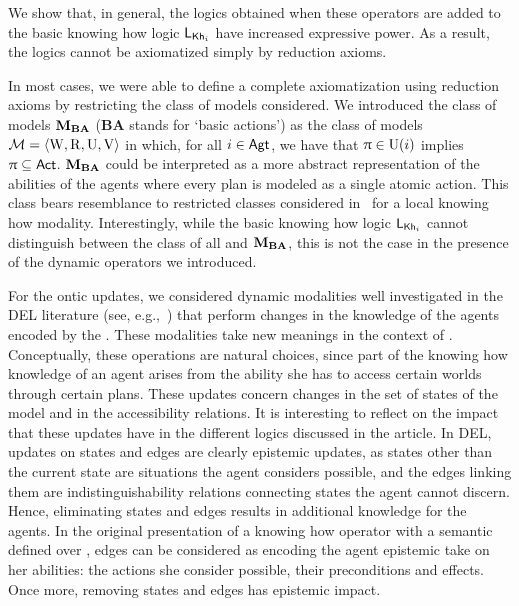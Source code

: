 We show that, in general, the logics obtained when these operators are added to the basic knowing how logic $\mathsf{L}_{{\sf Kh}_i}$ have increased expressive power.  As a result, the logics cannot be axiomatized simply by reduction axioms. 

\begin{mrevised}
In most cases, we were able to define a complete axiomatization using reduction axioms by restricting the class of models considered.  We introduced the class of models $\mathbf{M}_{\mathbf{BA}}$ (\textbf{BA} stands for `basic actions') as the class of models $\mathcal{M} = \langle \operatorname{W}, \operatorname{R}, \operatorname{U}, \operatorname{V} \rangle$ in which, for all $i \in {\rm \sf Agt}$, we have that $\uppi \in \operatorname{U}(i)$ implies $\uppi \subseteq {\rm \sf Act}$.  $\mathbf{M}_{\mathbf{BA}}$ could be interpreted as a more abstract representation of the abilities of the agents where every plan is modeled as a single atomic action.  This class bears resemblance to restricted classes considered in~\cite{Li21} for a local knowing how modality.
Interestingly, while the basic knowing how logic $\mathsf{L}_{{\sf Kh}_i}$ cannot distinguish between the class of all \ults and $\mathbf{M}_{\mathbf{BA}}$, this is not the case in the presence of the dynamic operators we introduced. 

For the ontic updates, we considered dynamic modalities well investigated in the DEL literature (see, e.g.,~\cite{Plaza89:lopc,KooiR11,DELbook}) that perform changes in the knowledge of the agents encoded by the \lts. These modalities take new meanings in the context of .  Conceptually, these operations are natural choices, since part of the knowing how knowledge of an agent arises from the ability she has to access certain worlds through certain plans.  These updates concern changes in the set of states of the model and in the accessibility relations.  It is interesting to reflect on the impact that these updates have in the different logics discussed in the article.  In DEL, updates on states and edges are clearly epistemic updates, as states other than the current state are situations the agent considers possible, and the edges linking them are indistinguishability relations connecting states the agent cannot discern.  Hence, eliminating states and edges results in additional knowledge for the agents.  In the original presentation of a knowing how operator with a semantic defined over \lts, edges can be considered as encoding the agent epistemic take on her abilities: the actions she consider possible, their preconditions and effects.  Once more, removing states and edges has epistemic impact.  



\end{mrevised}
